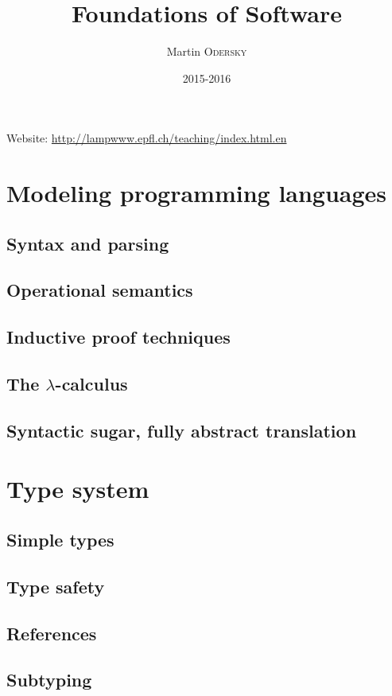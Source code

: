 

\title{Foundations of Software}
\author{Martin \textsc{Odersky}}
\date{2015-2016}


\maketitle
\tableofcontents

\newpage

Website: \url{http://lampwww.epfl.ch/teaching/index.html.en}

\part{Modeling programming languages}
    \chapter{Syntax and parsing}
    \chapter{Operational semantics}
    \chapter{Inductive proof techniques}
    \chapter{The \texorpdfstring{$\lambda$}{Lambda}-calculus}
    \chapter{Syntactic sugar, fully abstract translation}

\part{Type system}
    \chapter{Simple types}
    \chapter{Type safety}
    \chapter{References}
    \chapter{Subtyping}

